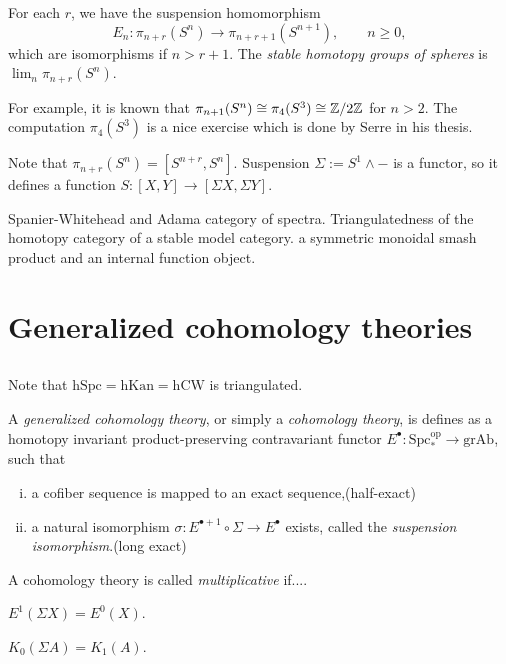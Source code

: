 \documentclass{../../large}
\begin{document}
\begin{prb}
For each $r$, we have the suspension homomorphism
\[E_n:\pi_{n+r}(S^n)\to\pi_{n+r+1}(S^{n+1}),\qquad n\ge0,\]
which are isomorphisms if $n>r+1$.
The \emph{stable homotopy groups of spheres} is $\lim_n\pi_{n+r}(S^n)$.

For example, it is known that $\pi_{n+1}(S^n)\cong\pi_4(S^3)\cong\mathbb{Z}/2\mathbb{Z}$ for $n>2$.
The computation $\pi_4(S^3)$ is a nice exercise which is done by Serre in his thesis.
\end{prb}


Note that $\pi_{n+r}(S^n)=[S^{n+r},S^n]$.
Suspension $\Sigma:=S^1\wedge-$ is a functor, so it defines a function $S:[X,Y]\to[\Sigma X,\Sigma Y]$.


Spanier-Whitehead and Adama category of spectra.
Triangulatedness of the homotopy category of a stable model category.
a symmetric monoidal smash product and an internal function object.




\part{Generalized cohomology theories}


\chapter{}
\begin{prb}

Note that $\mathrm{hSpc}=\mathrm{hKan}=\mathrm{hCW}$ is triangulated.


\end{prb}
\begin{prb}
A \emph{generalized cohomology theory}, or simply a \emph{cohomology theory}, is defines as a homotopy invariant product-preserving contravariant functor $E^\bullet:\mathrm{Spc}_*^\mathrm{op}\to\mathrm{grAb}$, such that
\begin{enumerate}[(i)]
\item a cofiber sequence is mapped to an exact sequence,\hfill(half-exact)
\item a natural isomorphism $\sigma:E^{\bullet+1}\circ\Sigma\to E^\bullet$ exists, called the \emph{suspension isomorphism}.\hfill(long exact)
\end{enumerate}
A cohomology theory is called \emph{multiplicative} if....

$E^1(\Sigma X)=E^0(X)$.

$K_0(\Sigma A)=K_1(A)$.
\end{prb}
\end{document}
